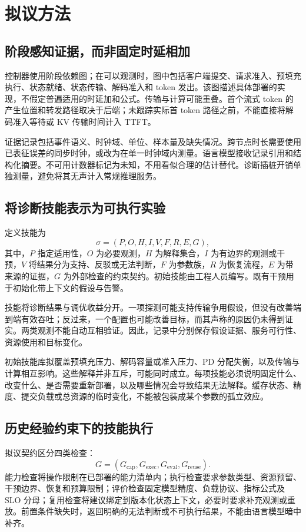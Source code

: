 \documentclass[preprint,12pt]{elsarticle}
\begin{document}
\section{拟议方法}
\subsection{阶段感知证据，而非固定时延相加}
控制器使用阶段依赖图；在可以观测时，图中包括客户端提交、请求准入、预填充执行、状态就绪、状态传输、解码准入和 token 发出。该图描述具体部署的实现，不假定普遍适用的时延加和公式。传输与计算可能重叠。首个流式 token 的产生位置和转发路径取决于后端；未跟踪实际首 token 路径之前，不能直接将解码准入等待或 KV 传输时间计入 TTFT。

证据记录包括事件语义、时钟域、单位、样本量及缺失情况。跨节点时长需要使用已表征误差的同步时钟，或改为在单一时钟域内测量。语言模型接收记录引用和结构化摘要。不可用计数器标记为未知，不用看似合理的估计替代。诊断插桩开销单独测量，避免将其无声计入常规推理服务。

\subsection{将诊断技能表示为可执行实验}
定义技能为
\begin{equation}
 \sigma=(P,O,H,I,V,F,R,E,G),
\end{equation}
其中，$P$ 指定适用性，$O$ 为必要观测，$H$ 为解释集合，$I$ 为有边界的观测或干预，$V$ 将结果分为支持、反驳或无法判断，$F$ 为参数族，$R$ 为恢复流程，$E$ 为带来源的证据，$G$ 为外部检查的约束契约。初始技能由工程人员编写。既有干预用于初始化带上下文的假设与告警。

技能将诊断结果与调优收益分开。一项探测可能支持传输争用假设，但没有改善端到端有效吞吐；反过来，一个配置也可能改善目标，而其声称的原因仍未得到证实。两类观测不能自动互相验证。因此，记录中分别保存假设证据、服务可行性、资源使用和目标变化。

初始技能库拟覆盖预填充压力、解码容量或准入压力、PD 分配失衡，以及传输与计算相互影响。这些解释并非互斥，可能同时成立。每项技能必须说明固定什么、改变什么、是否需要重新部署，以及哪些情况会导致结果无法解释。缓存状态、精度、提交负载或总资源的临时变化，不能被包装成某个参数的孤立效应。

\subsection{历史经验约束下的技能执行}
拟议契约区分四类检查：
\begin{equation}
 G=(G_{\mathrm{cap}},G_{\mathrm{exec}},G_{\mathrm{eval}},G_{\mathrm{reuse}}).
\end{equation}
能力检查将操作限制在已部署的能力清单内；执行检查要求参数类型、资源预留、干预边界、恢复和预算限制；评价检查固定模型精度、负载协议、指标公式及 SLO 分母；复用检查将建议绑定到版本化状态上下文，必要时要求补充观测或重放。前置条件缺失时，返回明确的无法判断或不可执行结果，不能由语言模型暗中补齐。
\end{document}
